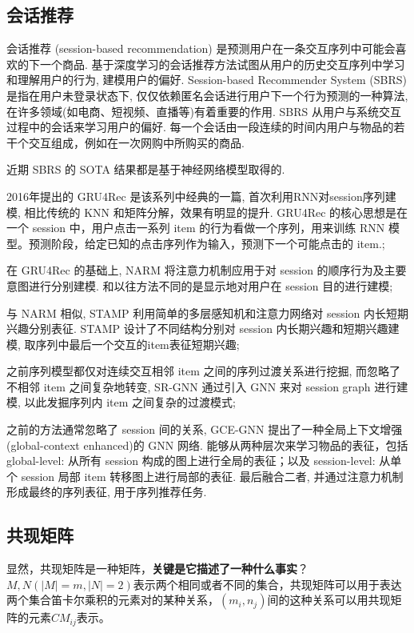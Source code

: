 \subsection{会话推荐}
会话推荐 (session-based recommendation) 是预测用户在一条交互序列中可能会喜欢的下一个商品. 基于深度学习的会话推荐方法试图从用户的历史交互序列中学习和理解用户的行为, 建模用户的偏好. Session-based Recommender System (SBRS) 是指在用户未登录状态下, 仅仅依赖匿名会话进行用户下一个行为预测的一种算法, 在许多领域(如电商、短视频、直播等)有着重要的作用. SBRS 从用户与系统交互过程中的会话来学习用户的偏好. 每一个会话由一段连续的时间内用户与物品的若干个交互组成，例如在一次网购中所购买的商品.

近期 SBRS 的 SOTA 结果都是基于神经网络模型取得的. 
\begin{myitemize}
	\item 2016年提出的 GRU4Rec 是该系列中经典的一篇, 首次利用RNN对session序列建模, 相比传统的 KNN 和矩阵分解，效果有明显的提升. GRU4Rec 的核心思想是在一个 session 中，用户点击一系列 item 的行为看做一个序列，用来训练 RNN 模型。预测阶段，给定已知的点击序列作为输入，预测下一个可能点击的 item.;
	
	\item 在 GRU4Rec 的基础上, NARM 将注意力机制应用于对 session 的顺序行为及主要意图进行分别建模. 和以往方法不同的是显示地对用户在 session 目的进行建模;
	
	\item 与 NARM 相似, STAMP 利用简单的多层感知机和注意力网络对 session 内长短期兴趣分别表征. STAMP 设计了不同结构分别对 session 内长期兴趣和短期兴趣建模, 取序列中最后一个交互的item表征短期兴趣;
	
	\item 之前序列模型都仅对连续交互相邻 item 之间的序列过渡关系进行挖掘, 而忽略了不相邻 item 之间复杂地转变, SR-GNN 通过引入 GNN 来对 session graph 进行建模, 以此发掘序列内 item 之间复杂的过渡模式;
	
	\item 之前的方法通常忽略了 session 间的关系, GCE-GNN 提出了一种全局上下文增强(global-context enhanced)的 GNN 网络. 能够从两种层次来学习物品的表征，包括 global-level: 从所有 session 构成的图上进行全局的表征；以及 session-level: 从单个 session 局部 item 转移图上进行局部的表征. 最后融合二者, 并通过注意力机制形成最终的序列表征, 用于序列推荐任务.
\end{myitemize}

\subsection{共现矩阵}
显然，共现矩阵是一种矩阵，\textbf{关键是它描述了一种什么事实}？$M, N(|M| = m, |N| = 2)$表示两个相同或者不同的集合，共现矩阵可以用于表达两个集合笛卡尔乘积的元素对的某种关系，$(m_i, n_j)$间的这种关系可以用共现矩阵的元素$CM_{ij}$表示。

